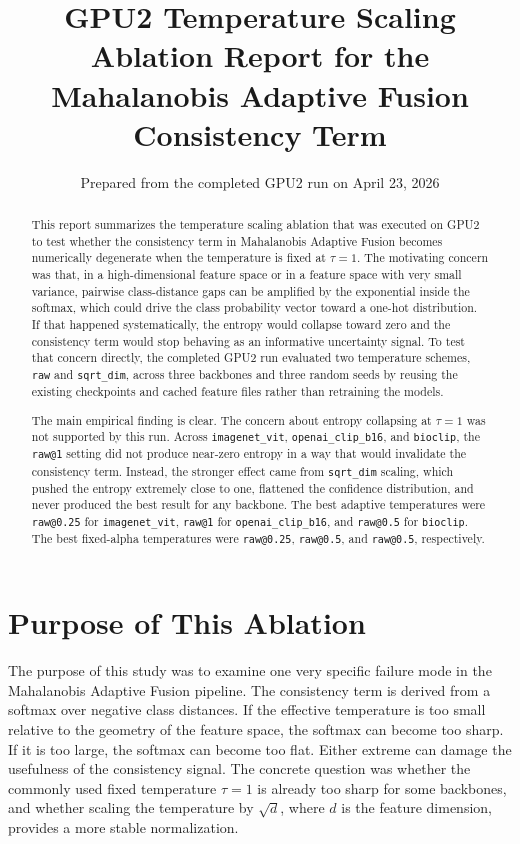 \documentclass[11pt]{article}
\title{GPU2 Temperature Scaling Ablation Report for the Mahalanobis Adaptive Fusion Consistency Term}
\author{Prepared from the completed GPU2 run on April 23, 2026}
\date{}
\begin{document}
\maketitle

\begin{abstract}
This report summarizes the temperature scaling ablation that was executed on GPU2 to test whether the consistency term in Mahalanobis Adaptive Fusion becomes numerically degenerate when the temperature is fixed at $\tau = 1$. The motivating concern was that, in a high-dimensional feature space or in a feature space with very small variance, pairwise class-distance gaps can be amplified by the exponential inside the softmax, which could drive the class probability vector toward a one-hot distribution. If that happened systematically, the entropy would collapse toward zero and the consistency term would stop behaving as an informative uncertainty signal. To test that concern directly, the completed GPU2 run evaluated two temperature schemes, \texttt{raw} and \texttt{sqrt\_dim}, across three backbones and three random seeds by reusing the existing checkpoints and cached feature files rather than retraining the models.

The main empirical finding is clear. The concern about entropy collapsing at $\tau = 1$ was not supported by this run. Across \texttt{imagenet\_vit}, \texttt{openai\_clip\_b16}, and \texttt{bioclip}, the \texttt{raw@1} setting did not produce near-zero entropy in a way that would invalidate the consistency term. Instead, the stronger effect came from \texttt{sqrt\_dim} scaling, which pushed the entropy extremely close to one, flattened the confidence distribution, and never produced the best result for any backbone. The best adaptive temperatures were \texttt{raw@0.25} for \texttt{imagenet\_vit}, \texttt{raw@1} for \texttt{openai\_clip\_b16}, and \texttt{raw@0.5} for \texttt{bioclip}. The best fixed-alpha temperatures were \texttt{raw@0.25}, \texttt{raw@0.5}, and \texttt{raw@0.5}, respectively.
\end{abstract}

\section{Purpose of This Ablation}

The purpose of this study was to examine one very specific failure mode in the Mahalanobis Adaptive Fusion pipeline. The consistency term is derived from a softmax over negative class distances. If the effective temperature is too small relative to the geometry of the feature space, the softmax can become too sharp. If it is too large, the softmax can become too flat. Either extreme can damage the usefulness of the consistency signal. The concrete question was whether the commonly used fixed temperature $\tau = 1$ is already too sharp for some backbones, and whether scaling the temperature by $\sqrt{d}$, where $d$ is the feature dimension, provides a more stable normalization.
\end{document}
